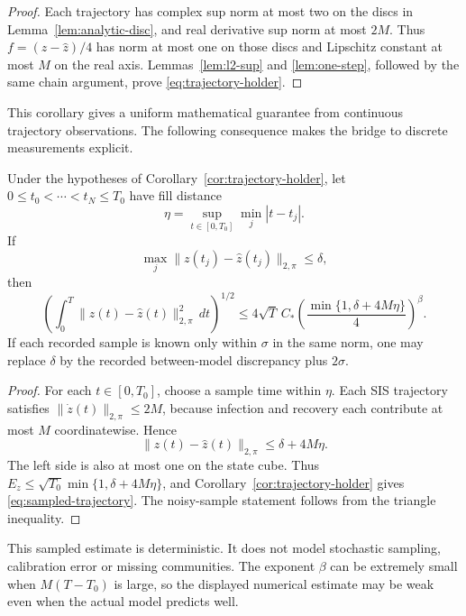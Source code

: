 \begin{proof}
Each trajectory has complex sup norm at most two on the discs in Lemma~\ref{lem:analytic-disc}, and real derivative sup norm at most $2M$. Thus $f=(z-\widehat z)/4$ has norm at most one on those discs and Lipschitz constant at most $M$ on the real axis. Lemmas~\ref{lem:l2-sup} and \ref{lem:one-step}, followed by the same chain argument, prove \eqref{eq:trajectory-holder}.
\end{proof}

This corollary gives a uniform mathematical guarantee from continuous trajectory observations. The following consequence makes the bridge to discrete measurements explicit.

\begin{corollary}
\label{cor:sampled-trajectory}
Under the hypotheses of Corollary~\ref{cor:trajectory-holder}, let
$0\leq t_0<\cdots<t_N\leq T_0$ have fill distance
\[
 \eta=\sup_{t\in[0,T_0]}\min_j|t-t_j|.
\]
If
\[
 \max_j\|z(t_j)-\widehat z(t_j)\|_{2,\pi}\leq\delta,
\]
then
\begin{equation}
 \left(\int_0^T\|z(t)-\widehat z(t)\|_{2,\pi}^2\,dt\right)^{1/2}
 \leq4\sqrt T\,C_*
 \left(\frac{\min\{1,\delta+4M\eta\}}4\right)^\beta.
 \label{eq:sampled-trajectory}
\end{equation}
If each recorded sample is known only within $\sigma$ in the same norm, one
may replace $\delta$ by the recorded between-model discrepancy plus $2\sigma$.
\end{corollary}

\begin{proof}
For each $t\in[0,T_0]$, choose a sample time within $\eta$. Each SIS
trajectory satisfies $\|\dot z(t)\|_{2,\pi}\leq2M$, because infection and
recovery each contribute at most $M$ coordinatewise. Hence
\[
 \|z(t)-\widehat z(t)\|_{2,\pi}\leq\delta+4M\eta.
\]
The left side is also at most one on the state cube. Thus
$E_z\leq\sqrt{T_0}\min\{1,\delta+4M\eta\}$, and
Corollary~\ref{cor:trajectory-holder} gives \eqref{eq:sampled-trajectory}.
The noisy-sample statement follows from the triangle inequality.
\end{proof}

This sampled estimate is deterministic. It does not model stochastic sampling,
calibration error or missing communities. The exponent $\beta$ can be extremely
small when $M(T-T_0)$ is large, so the displayed numerical estimate may be weak
even when the actual model predicts well.

